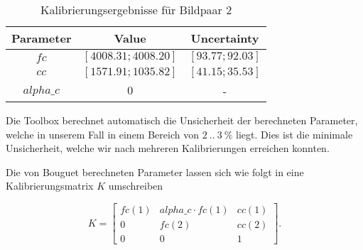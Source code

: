 \begin{table}[htbp]
\begin{center} 
\begin{tabular}{c|c|c}
Parameter & Value                                     & Uncertainty       \\ \hline
$fc$      & $[4008.31; 4008.20]$                      & $[93.77; 92.03]$ \\ \hline
$cc$      & $[1571.91; 1035.82]$ & $[41.15; 35.53]$ \\ \hline
$alpha\_c$ & $0$                  & -                
\end{tabular}
\caption{Kalibrierungsergebnisse für Bildpaar 2} 
\end{center}
\label{tab:kalibrierungsergebnisse2} 
\end{table}

Die Toolbox berechnet automatisch die Unsicherheit der berechneten Parameter, welche in unserem Fall in einem Bereich von $2~..~3~\%$ liegt. Dies ist die minimale Unsicherheit, welche wir nach mehreren Kalibrierungen erreichen konnten.

Die von Bouguet berechneten Parameter lassen sich wie folgt in eine Kalibrierungsmatrix $K$ umschreiben

\begin{equation}
  \label{eq:umformung_kameramatrix}
K = \begin{bmatrix} fc(1) & alpha\_c \cdot fc(1) & cc(1) \\ 0 & fc(2) & cc(2) \\ 0 & 0 & 1  \end{bmatrix}.
\end{equation}